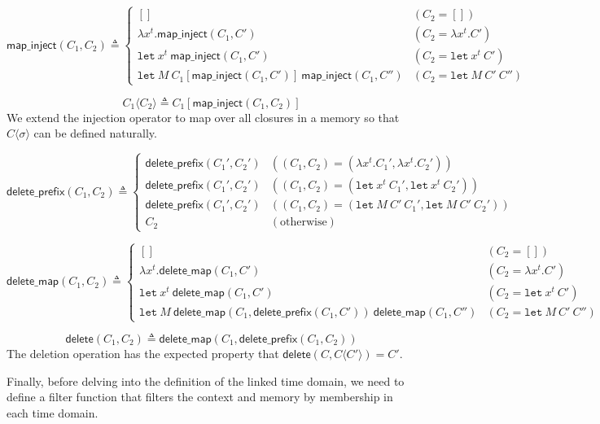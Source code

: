 \documentclass{article}
\theoremstyle{definition}
\newcommand*{\mapinject}{\mathsf{map\_inject}}
\newcommand*{\inject}[2]{{#1}\langle{#2}\rangle}
\newcommand*{\deletepre}{\mathsf{delete\_prefix}}
\newcommand*{\deletemap}{\mathsf{delete\_map}}
\newcommand*{\delete}{\mathsf{delete}}
\newcommand*{\Let}{\mathtt{let}}
\begin{document}
\[
  \mapinject(C_{1},C_{2})\triangleq
  \begin{cases}
    []                                                          & (C_{2}=[])                \\
    \lambda x^{t}. \mapinject(C_{1},C')                         & (C_{2}=\lambda x^{t}. C') \\
    \Let\:x^{t}\:\mapinject(C_{1},C')                           & (C_{2}=\Let\:x^{t}\:C')   \\
    \Let\:M\:C_{1}[\mapinject(C_{1},C')]\:\mapinject(C_{1},C'') & (C_{2}=\Let\:M\:C'\:C'')
  \end{cases}
\]

\[
  \inject{C_{1}}{C_{2}}\triangleq C_{1}[\mapinject(C_{1},C_{2})]
\]
We extend the injection operator to map over all closures in a memory so that $\inject{C}{\sigma}$ can be defined naturally.

\[
  \deletepre(C_{1},C_{2})\triangleq
  \begin{cases}
    \deletepre(C_{1}',C_{2}') & ((C_{1},C_{2})=(\lambda x^{t}.C_{1}',\lambda x^{t}.C_{2}')) \\
    \deletepre(C_{1}',C_{2}') & ((C_{1},C_{2})=(\Let\: x^{t}\:C_{1}',\Let\:x^{t}\:C_{2}'))  \\
    \deletepre(C_{1}',C_{2}') & ((C_{1},C_{2})=(\Let\:M\:C'\:C_{1}',\Let\:M\:C'\:C_{2}'))   \\
    C_{2}                     & (\text{otherwise})
  \end{cases}
\]

\[
  \deletemap(C_{1},C_{2})\triangleq
  \begin{cases}
    []                                                                     & (C_{2}=[])               \\
    \lambda x^{t}.\deletemap(C_{1},C')                                     & (C_{2}=\lambda x^{t}.C') \\
    \Let\:x^{t}\:\deletemap(C_{1},C')                                      & (C_{2}=\Let\:x^{t}\:C')  \\
    \Let\:M\:\deletemap(C_{1},\deletepre(C_{1},C'))\:\deletemap(C_{1},C'') & (C_{2}=\Let\:M\:C'\:C'')
  \end{cases}
\]

\[
  \delete(C_{1},C_{2})\triangleq \deletemap(C_{1},\deletepre(C_{1},C_{2}))
\]
The deletion operation has the expected property that $\delete(C,\inject{C}{C'})=C'$.

Finally, before delving into the definition of the linked time domain, we need to define a filter function that filters the context and memory by membership in each time domain.
\end{document}
